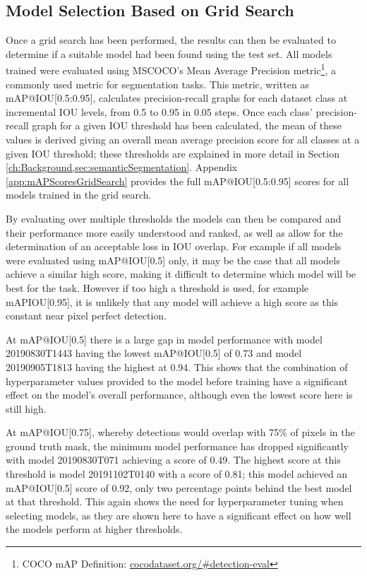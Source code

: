 \subsection{Model Selection Based on Grid Search}\label{ch:cetDet,sec:ModelSelection,sub:ModelSelectionBasedOnGridSearch}

Once a grid search has been performed, the results can then be evaluated to determine if a suitable model had been found using the test set. All models trained were evaluated using MSCOCO's Mean Average Precision metric\footnote{COCO mAP Definition: \href{https://cocodataset.org/\#detection-eval}{cocodataset.org/\#detection-eval}}, a commonly used metric for segmentation tasks. This metric, written as mAP@IOU[0.5:0.95], calculates precision-recall graphs for each dataset class at incremental IOU levels, from 0.5 to 0.95 in 0.05 steps. Once each class' precision-recall graph for a given IOU threshold has been calculated, the mean of these values is derived giving an overall mean average precision score for all classes at a given IOU threshold; these thresholds are explained in more detail in Section \ref{ch:Background,sec:semanticSegmentation}. Appendix \ref{app:mAPScoresGridSearch} provides the full mAP@IOU[0.5:0.95] scores for all models trained in the grid search.

By evaluating over multiple thresholds the models can then be compared and their performance more easily understood and ranked, as well as allow for the determination of an acceptable loss in IOU overlap. For example if all models were evaluated using mAP@IOU[0.5] only, it may be the case that all models achieve a similar high score, making it difficult to determine which model will be best for the task. However if too high a threshold is used, for example mAPIOU[0.95], it is unlikely that any model will achieve a high score as this constant near pixel perfect detection. 

At mAP@IOU[0.5] there is a large gap in model performance with model 20190830T1443 having the lowest mAP@IOU[0.5] of 0.73 and model 20190905T1813 having the highest at 0.94. This shows that the combination of hyperparameter values provided to the model before training have a significant effect on the model's overall performance, although even the lowest score here is still high. 

At mAP@IOU[0.75], whereby detections would overlap with 75\% of pixels in the ground truth mask, the minimum model performance has dropped significantly with model 20190830T071 achieving a score of 0.49. The highest score at this threshold is model 20191102T0140 with a score of 0.81; this model achieved an mAP@IOU[0.5] score of 0.92, only two percentage points behind the best model at that threshold. This again shows the need for hyperparameter tuning when selecting models, as they are shown here to have a significant effect on how well the models perform at higher thresholds.

